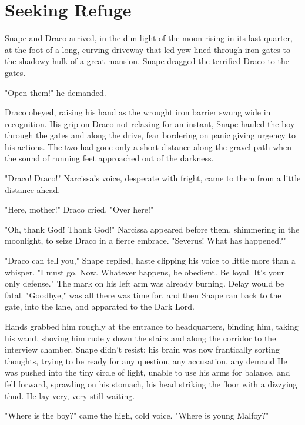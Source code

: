 
\chapter{Seeking Refuge}

Snape and Draco arrived, in the dim light of the moon rising in its last quarter, at the foot of a long, curving driveway that led yew-lined through iron gates to the shadowy hulk of a great mansion. Snape dragged the terrified Draco to the gates.

"Open them!" he demanded.

Draco obeyed, raising his hand as the wrought iron barrier swung wide in recognition. His grip on Draco not relaxing for an instant, Snape hauled the boy through the gates and along the drive, fear bordering on panic giving urgency to his actions. The two had gone only a short distance along the gravel path when the sound of running feet approached out of the darkness.

"Draco! Draco!" Narcissa's voice, desperate with fright, came to them from a little distance ahead.

"Here, mother!" Draco cried. "Over here!"

"Oh, thank God! Thank God!" Narcissa appeared before them, shimmering in the moonlight, to seize Draco in a fierce embrace. "Severus! What has happened?"

"Draco can tell you," Snape replied, haste clipping his voice to little more than a whisper. "I must go. Now. Whatever happens, be obedient. Be loyal. It's your only defense." The mark on his left arm was already burning. Delay would be fatal. "Goodbye," was all there was time for, and then Snape ran back to the gate, into the lane, and apparated to the Dark Lord.

Hands grabbed him roughly at the entrance to headquarters, binding him, taking his wand, shoving him rudely down the stairs and along the corridor to the interview chamber. Snape didn't resist; his brain was now frantically sorting thoughts, trying to be ready for any question, any accusation, any demand{\el} He was pushed into the tiny circle of light, unable to use his arms for balance, and fell forward, sprawling on his stomach, his head striking the floor with a dizzying thud. He lay very, very still{\el} waiting.

"Where is the boy?" came the high, cold voice. "Where is young Malfoy?"


